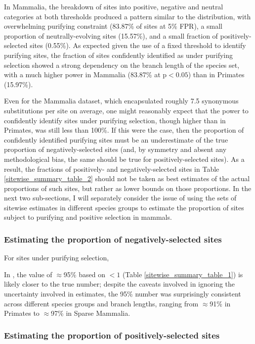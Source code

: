 In Mammalia, the breakdown of sites into positive, negative and
neutral categories at both \fpr thresholds produced a pattern similar
to the \omgml distribution, with overwhelming purifying constraint
(83.87\% of sites at 5\% FPR), a small proportion of
neutrally-evolving sites (15.57\%), and a small fraction of
positively-selected sites (0.55\%). As expected given the use of a
fixed \slrt threshold to identify purifying sites, the fraction of
sites confidently identified as under purifying selection showed a
strong dependency on the branch length of the species set, with a much
higher power in Mammalia (83.87\% at p$<0.05$) than in Primates
(15.97\%).

Even for the Mammalia dataset, which encapsulated roughly 7.5
synonymous substitutions per site on average, one might reasonably
expect that the power to confidently identify sites under purifying
selection, though higher than in Primates, was still less than
100\%. If this were the case, then the proportion of confidently
identified purifying sites must be an underestimate of the true
proportion of negatively-selected sites (and, by symmetry and absent
any methodological bias, the same should be true for
positively-selected sites). As a result, the fractions of positively-
and negatively-selected sites in Table \ref{sitewise_summary_table_2}
should not be taken as best estimates of the actual proportions of
such sites, but rather as lower bounds on those proportions. In the
next two sub-sections, I will separately consider the issue of using
the sets of sitewise estimates in different species groups to estimate
the proportion of sites subject to purifying and positive selection in
mammals.

\subsubsection{Estimating the proportion of negatively-selected sites}

For sites under purifying selection, 

In , the value of $\approx$95\% based on \omgml$<1$ (Table
\ref{sitewise_summary_table_1}) is likely closer to the true number;
despite the caveats involved in ignoring the uncertainty involved in
\omgml estimates, the 95\% number was surprisingly consistent across
different species groups and branch lengths, ranging from
$\approx$91\% in Primates to $\approx$97\% in Sparse Mammalia.

\subsubsection{Estimating the proportion of positively-selected sites}

